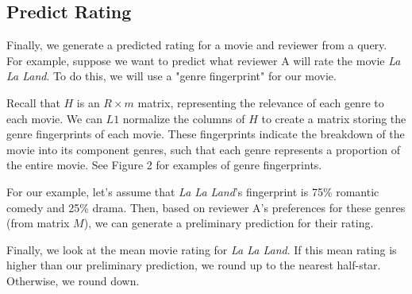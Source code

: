 \documentclass[letterpaper, 10 pt, conference]{ieeeconf}  %
\begin{document}
\subsection{Predict Rating}
Finally, we generate a predicted rating for a movie and reviewer from a query. For example, suppose we want to predict what reviewer A will rate the movie \textit{La La Land}. To do this, we will use a "genre fingerprint" for our movie.

Recall that $H$ is an $R \times m$ matrix, representing the relevance of each genre to each movie. We can $L1$ normalize the columns of $H$ to create a matrix storing the genre fingerprints of each movie.
These fingerprints indicate the breakdown of the movie into its component genres, such that each genre represents a proportion of the entire movie. See Figure 2 for examples of genre fingerprints.

For our example, let's assume that \textit{La La Land}'s fingerprint is 75\% romantic comedy and 25\% drama. Then, based on reviewer A's preferences for these genres (from matrix $M$), we can generate a preliminary prediction for their rating.

Finally, we look at the mean movie rating for \textit{La La Land}. If this mean rating is higher than our preliminary prediction, we round up to the nearest half-star. Otherwise, we round down.
\end{document}
